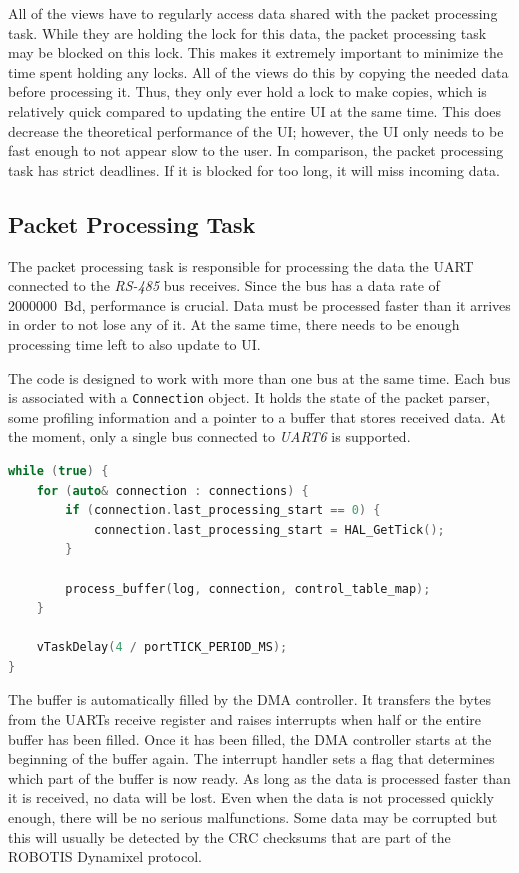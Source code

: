 All of the views have to regularly access data shared with the packet processing task. While they
are holding the lock for this data, the packet processing task may be blocked on this lock. This
makes it extremely important to minimize the time spent holding any locks. All of the views do this
by copying the needed data before processing it. Thus, they only ever hold a lock to make copies,
which is relatively quick compared to updating the entire UI at the same time. This does decrease
the theoretical performance of the UI; however, the UI only needs to be fast enough to not appear
slow to the user. In comparison, the packet processing task has strict deadlines. If it is blocked
for too long, it will miss incoming data.

\subsection{Packet Processing Task}
\label{implementation/software/packet-processing-task}

The packet processing task is responsible for processing the data the UART connected to the \textit{RS-485}
bus receives. Since the bus has a data rate of \SI{2000000}{Bd}, performance is crucial. Data must be
processed faster than it arrives in order to not lose any of it. At the same time, there needs to be
enough processing time left to also update to UI.

The code is designed to work with more than one bus at the same time. Each bus is associated with
a \lstinline{Connection} object. It holds the state of the packet parser, some profiling information
and a pointer to a buffer that stores received data. At the moment, only a single bus connected to
\textit{UART6} is supported.

\begin{lstlisting}[language=C++, caption={Main loop of the packet processing task}]
while (true) {
    for (auto& connection : connections) {
        if (connection.last_processing_start == 0) {
            connection.last_processing_start = HAL_GetTick();
        }

        process_buffer(log, connection, control_table_map);
    }

    vTaskDelay(4 / portTICK_PERIOD_MS);
}
\end{lstlisting}

The buffer is automatically filled by the DMA controller. It transfers the bytes from the UARTs
receive register and raises interrupts when half or the entire buffer has been filled. Once it has
been filled, the DMA controller starts at the beginning of the buffer again. The interrupt handler
sets a flag that determines which part of the buffer is now ready. As long as the data is processed
faster than it is received, no data will be lost. Even when the data is not processed quickly enough,
there will be no serious malfunctions. Some data may be corrupted but this will usually be detected
by the CRC checksums that are part of the ROBOTIS Dynamixel protocol.

